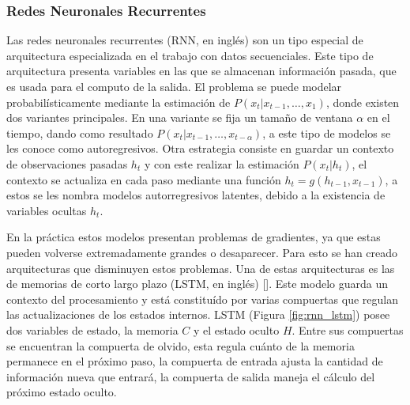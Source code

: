 \subsubsection{Redes Neuronales Recurrentes}

Las redes neuronales recurrentes (RNN, en inglés) son
un tipo especial de arquitectura especializada en el trabajo con datos secuenciales. Este tipo de arquitectura
presenta variables en las que se almacenan información pasada, que es usada para el computo de la salida. El 
problema se puede modelar probabilísticamente mediante la estimación de $P(x_t | x_{t-1}, \dots, x_{1})$,
donde existen dos variantes principales. En una variante se fija un tamaño de ventana $\alpha$ en el tiempo, 
dando como resultado $P(x_t | x_{t-1}, \dots, x_{t-\alpha})$, a este tipo de modelos se les conoce como autoregresivos. 
Otra estrategia consiste en guardar un contexto de observaciones pasadas $h_t$ y con este realizar la estimación 
$P(x_t | h_t)$, el contexto se actualiza en cada paso mediante una función $h_t = g(h_{t-1}, x_{t-1})$, a estos 
se les nombra modelos autorregresivos latentes, debido a la existencia de variables ocultas $h_t$. 

En la práctica estos modelos presentan problemas de gradientes, ya que estas pueden volverse extremadamente grandes o 
desaparecer.
Para esto se han creado arquitecturas que disminuyen estos problemas. Una de estas arquitecturas es las de memorias
de corto largo plazo (LSTM, en inglés) [\cite{hochreiter1997long}].
Este modelo guarda un contexto del procesamiento y está constituído por varias compuertas que regulan las 
actualizaciones de los estados internos. LSTM (Figura \ref{fig:rnn_lstm}) posee dos variables de estado, la memoria 
$C$ y el estado oculto $H$. Entre sus compuertas se encuentran la compuerta de olvido, esta regula cuánto de la 
memoria permanece en el próximo paso, la compuerta de entrada ajusta la cantidad de información nueva que entrará, 
la compuerta de salida maneja el cálculo del próximo estado oculto.

